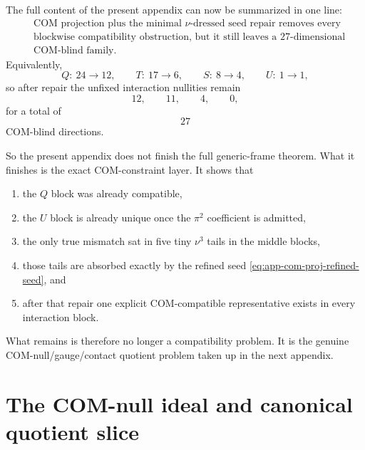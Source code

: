 \documentclass[11pt]{article}
\begin{document}
The full content of the present appendix can now be summarized in one line:
\begin{equation}
\boxed{
\begin{aligned}
&\text{COM projection plus the minimal $\nu$-dressed seed repair removes every}\\
&\text{blockwise compatibility obstruction, but it still leaves a }27\text{-dimensional}\\
&\text{COM-blind family.}
\end{aligned}}
\label{eq:app-com-proj-summary-line}
\end{equation}
Equivalently,
\begin{equation}
Q:\ 24\to 12,
\qquad
T:\ 17\to 6,
\qquad
S:\ 8\to 4,
\qquad
U:\ 1\to 1,
\label{eq:app-com-proj-block-map-summary}
\end{equation}
so after repair the unfixed interaction nullities remain
\begin{equation}
12,\qquad 11,\qquad 4,\qquad 0,
\label{eq:app-com-proj-nullity-summary}
\end{equation}
for a total of
\begin{equation}
\boxed{27}
\label{eq:app-com-proj-total-nullity-repeat}
\end{equation}
COM-blind directions.

So the present appendix does not finish the full generic-frame theorem.  What it
finishes is the exact COM-constraint layer.  It shows that
\begin{enumerate}
  \item the $Q$ block was already compatible,
  \item the $U$ block is already unique once the $\pi^2$ coefficient is admitted,
  \item the only true mismatch sat in five tiny $\nu^3$ tails in the middle
  blocks,
  \item those tails are absorbed exactly by the refined seed
  \eqref{eq:app-com-proj-refined-seed}, and
  \item after that repair one explicit COM-compatible representative exists in
  every interaction block.
\end{enumerate}
What remains is therefore no longer a compatibility problem.  It is the
genuine COM-null\allowbreak/\allowbreak gauge\allowbreak/\allowbreak contact
quotient problem taken up in the next appendix.


\section{The COM-null ideal and canonical quotient slice}
\label{app:com-null}
\end{document}

